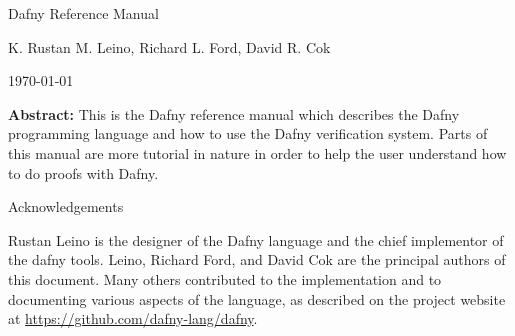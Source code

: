 \begin{center}\Huge Dafny Reference Manual\end{center}
\begin{center}K. Rustan M. Leino, Richard L. Ford, David R. Cok\end{center}
\begin{center}\today\end{center}
\vspace{1in}
\textbf{Abstract:} This is the Dafny reference manual which describes the Dafny programming
language and how to use the Dafny verification system.
Parts of this manual are more tutorial in nature in order to help the
user understand how to do proofs with Dafny.

\vspace{1in}
\begin{center}\Large Acknowledgements\end{center}
Rustan Leino is the designer of the Dafny language and the chief implementor of the dafny tools. Leino, Richard Ford, and David Cok are the principal authors of this document. Many others contributed to the implementation and to documenting various aspects of the language, as described on the project website at \url{https://github.com/dafny-lang/dafny}.
\newpage
